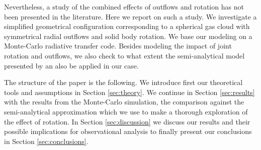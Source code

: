 \documentclass[a4paper,fleqn,usenatbib]{mnras}
\begin{document}
Nevertheless, a study of the combined effects of outflows and
rotation has not been presented in the literature.
Here we report on such a study. 
We investigate a simplified geometrical configuration corresponding to a
spherical gas cloud with symmetrical radial outflows and solid body
rotation. 
We base our modeling on a Monte-Carlo radiative transfer code.
Besides modeling the impact of joint rotation and outflows, we also
check to what extent the semi-analytical model presented by
\cite{Garavito14} an also be applied in our case.

The structure of the paper is the following.
We introduce first our theoretical tools and assumptions
in Section \ref{sec:theory}. We continue in Section \ref{sec:results}
with the results from the Monte-Carlo simulation, the comparison
against the semi-analytical approximation which we use to make a
thorough exploration of the effect of rotation.
In Section \ref{sec:discussion} we discuss our results and their
possible implications for observational analysis to finally present
our conclusions in Section \ref{sec:conclusions}.
\end{document}
